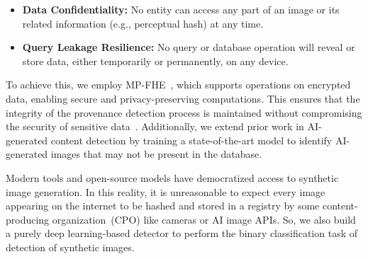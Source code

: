 \documentclass[11pt]{article}
\begin{document}
\begin{itemize}
 \item \textbf{Data Confidentiality:} No entity can access any part of an image or its related information (e.g., perceptual hash) at any time.
 \item \textbf{Query Leakage Resilience:} No query or database operation will reveal or store data, either temporarily or permanently, on any device.
\end{itemize}

\noindent
To achieve this, we employ MP-FHE~\cite{mouchet2021multiparty}, which supports operations on encrypted data, enabling secure and privacy-preserving computations. This ensures that the integrity of the provenance detection process is maintained without compromising the security of sensitive data~\cite{gentry2009fully}. Additionally, we extend prior work in AI-generated content detection by training a state-of-the-art model to identify AI-generated images that may not be present in the database.


Modern tools and open-source models have democratized access to synthetic image generation. In this reality, it is unreasonable to expect every image appearing on the internet to be hashed and stored in a registry by some content-producing organization~(CPO) like cameras or AI image APIs. So, we also build a purely deep learning-based detector to perform the binary classification task of detection of synthetic images.




\pagebreak




\end{document}
